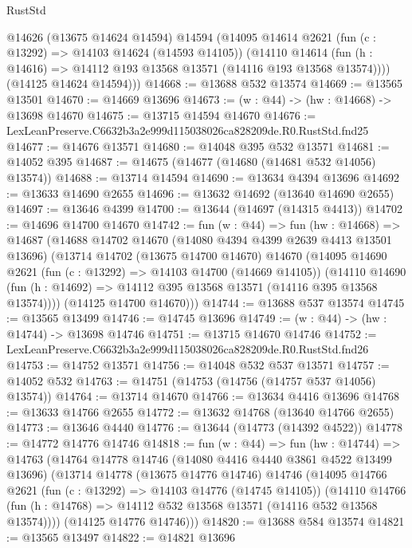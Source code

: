 \begin{lexlean}{RustStd}
\begin{coremodule}
        @14626
        (@13675 @14624 @14594)
        @14594
        (@14095
          @14614
          @2621
          (fun (c : @13292) => @14103 @14624 (@14593 @14105))
          (@14110
            @14614
            (fun (h : @14616) => @14112 @193 @13568 @13571 (@14116 @193 @13568 @13574))))
        (@14125 @14624 @14594)))
@14668 := @13688 @532 @13574
@14669 := @13565 @13501
@14670 := @14669 @13696
@14673 := (w : @44) -> (hw : @14668) -> @13698 @14670
@14675 := @13715 @14594 @14670
@14676 := LexLeanPreserve.C6632b3a2e999d115038026ca828209de.R0.RustStd.fnd25
@14677 := @14676 @13571
@14680 := @14048 @395 @532 @13571
@14681 := @14052 @395
@14687 := @14675 (@14677 (@14680 (@14681 @532 @14056) @13574))
@14688 := @13714 @14594
@14690 := @13634 @4394 @13696
@14692 := @13633 @14690 @2655
@14696 := @13632 @14692 (@13640 @14690 @2655)
@14697 := @13646 @4399
@14700 := @13644 (@14697 (@14315 @4413))
@14702 := @14696 @14700 @14670
@14742 := fun (w : @44) =>
  fun (hw : @14668) =>
  @14687
    (@14688
      @14702
      @14670
      (@14080 @4394 @4399 @2639 @4413 @13501 @13696)
      (@13714
        @14702
        (@13675 @14700 @14670)
        @14670
        (@14095
          @14690
          @2621
          (fun (c : @13292) => @14103 @14700 (@14669 @14105))
          (@14110
            @14690
            (fun (h : @14692) => @14112 @395 @13568 @13571 (@14116 @395 @13568 @13574))))
        (@14125 @14700 @14670)))
@14744 := @13688 @537 @13574
@14745 := @13565 @13499
@14746 := @14745 @13696
@14749 := (w : @44) -> (hw : @14744) -> @13698 @14746
@14751 := @13715 @14670 @14746
@14752 := LexLeanPreserve.C6632b3a2e999d115038026ca828209de.R0.RustStd.fnd26
@14753 := @14752 @13571
@14756 := @14048 @532 @537 @13571
@14757 := @14052 @532
@14763 := @14751 (@14753 (@14756 (@14757 @537 @14056) @13574))
@14764 := @13714 @14670
@14766 := @13634 @4416 @13696
@14768 := @13633 @14766 @2655
@14772 := @13632 @14768 (@13640 @14766 @2655)
@14773 := @13646 @4440
@14776 := @13644 (@14773 (@14392 @4522))
@14778 := @14772 @14776 @14746
@14818 := fun (w : @44) =>
  fun (hw : @14744) =>
  @14763
    (@14764
      @14778
      @14746
      (@14080 @4416 @4440 @3861 @4522 @13499 @13696)
      (@13714
        @14778
        (@13675 @14776 @14746)
        @14746
        (@14095
          @14766
          @2621
          (fun (c : @13292) => @14103 @14776 (@14745 @14105))
          (@14110
            @14766
            (fun (h : @14768) => @14112 @532 @13568 @13571 (@14116 @532 @13568 @13574))))
        (@14125 @14776 @14746)))
@14820 := @13688 @584 @13574
@14821 := @13565 @13497
@14822 := @14821 @13696

\end{coremodule}
\end{lexlean}
